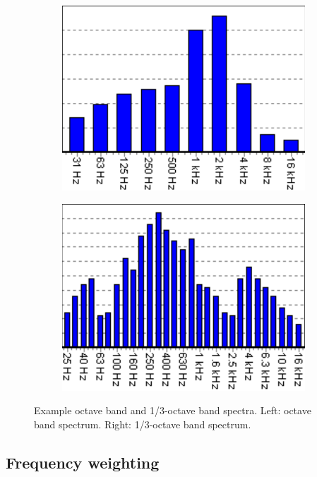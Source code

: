 \begin{figure}[H]
	\centering
	\begin{subfigure}[b]{0.49\textwidth}
		\centering
		\includegraphics[width=0.8\linewidth]{fig/octave_band.PNG}
	\end{subfigure}
	\begin{subfigure}[b]{0.49\textwidth}
		\centering
		\includegraphics[width=0.8\linewidth]{fig/one_third_octave_band.PNG}
	\end{subfigure}
	\caption{Example octave band and 1/3-octave band spectra. Left: octave band spectrum. Right: 1/3-octave band spectrum. \cite{octave_band} }
	\label{fig:octave_band_filters}
\end{figure}

\newpage
\subsection{Frequency weighting}

